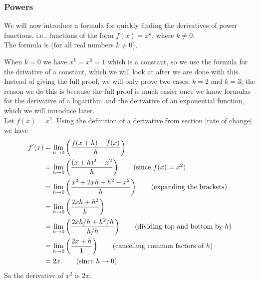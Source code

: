 \subsubsection{Powers}
We will now introduce a formula for quickly finding the derivatives of power functions, i.e., functions of the form $f(x) = x^k$, where $k \neq 0$. \\

\noindent The formula is (for all real numbers $k \neq 0$),

  	\bigskip
	
	\hfil{}
	\bigskip
	\bigskip
	
\noindent When $k = 0$ we have $x^k = x^0 = 1$ which is a constant, so we use the formula for the drivative of a constant, which we will look at after we are done with this. \\

\noindent Instead of giving the full proof, we will only prove two cases, $k = 2$ and $k=3$; the reason we do this is because the full proof is much easier once we know formulas for the derivative of a logarithm and the derivative of an exponential function, which we will introduce later. \\ 

\noindent Let $f(x) = x^2$. Using the definition of a derivative from section \ref{rate of change} we have
\begin{align*}
f'(x)  & = \lim_{h \rightarrow 0}\left(\frac{f(x+h) - f(x)}{h}\right) \\
	& = \lim_{h \rightarrow 0}\left(\frac{(x+h)^2 - x^2}{h}\right) \tag{since $f(x) = x^2$} \\
	& = \lim_{h \rightarrow 0}\left(\frac{x^2 + 2xh + h^2 - x^2}{h}\right) \tag{expanding the brackets} \\
	& = \lim_{h \rightarrow 0}\left(\frac{2xh + h^2}{h}\right) \\
	& = \lim_{h \rightarrow 0}\left(\frac{2xh/h + h^2/h}{h/h}\right) \tag{dividing top and bottom by $h$} \\
	& = \lim_{h \rightarrow 0}\left(\frac{2x + h}{1}\right) \tag{cancelling common factors of $h$} \\
	& = 2x. \tag{since $h \rightarrow 0$}
\end{align*}
So the derivative of $x^2$ is $2x$. \\

